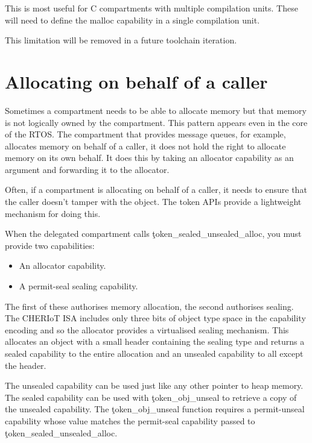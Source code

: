 This is most useful for C compartments with multiple compilation units.
These will need to define the malloc capability in a single compilation unit.

\begin{note}
This limitation will be removed in a future toolchain iteration.
\end{note}

\section[label=token_apis]{Allocating on behalf of a caller}

Sometimes a compartment needs to be able to allocate memory but that memory is not logically owned by the compartment.
This pattern appears even in the core of the RTOS.
The compartment that provides message queues, for example, allocates memory on behalf of a caller, it does not hold the right to allocate memory on its own behalf.
It does this by taking an allocator capability as an argument and forwarding it to the allocator.

Often, if a compartment is allocating on behalf of a caller, it needs to ensure that the caller doesn't tamper with the object.
The token APIs provide a lightweight mechanism for doing this.




When the delegated compartment calls \c{token_sealed_unsealed_alloc}, you must provide two capabilities:

\begin{itemize}
	\item{An allocator capability.}
	\item{A permit-seal sealing capability.}
\end{itemize}

The first of these authorises memory allocation, the second authorises sealing.
The CHERIoT ISA includes only three bits of object type space in the capability encoding and so the allocator provides a virtualised sealing mechanism.
This allocates an object with a small header containing the sealing type and returns a sealed capability to the entire allocation and an unsealed capability to all except the header.

The unsealed capability can be used just like any other pointer to heap memory.
The sealed capability can be used with \c{token_obj_unseal} to retrieve a copy of the unsealed capability.
The \c{token_obj_unseal} function requires a permit-unseal capability whose value matches the permit-seal capability passed to \c{token_sealed_unsealed_alloc}.

